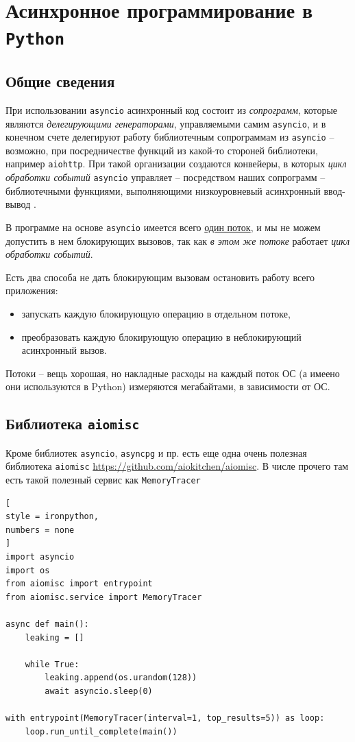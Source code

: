 \documentclass[%
	11pt,
	a4paper,
	utf8,
		]{article}
\begin{document}
\section{Асинхронное программирование в \texttt{Python}}

\subsection{Общие сведения}

При использовании \texttt{asyncio} асинхронный код состоит из \emph{сопрограмм}, которые являются \emph{делегирующими генераторами}, управляемыми самим \texttt{asyncio}, и в конечном счете делегируют работу библиотечным сопрограммам из \texttt{asyncio} -- возможно, при посредничестве функций из какой-то стороней библиотеки, например \texttt{aiohttp}. При такой организации создаются конвейеры, в которых \emph{цикл обработки событий} \texttt{asyncio} управляет -- посредством наших сопрограмм -- библиотечными функциями, выполняющими низкоуровневый асинхронный ввод-вывод \cite[]{ramalho:python-2016}.

В программе на основе \texttt{asyncio} имеется всего \underline{один поток}, и мы не можем допустить в нем блокирующих вызовов, так как \emph{в этом же потоке} работает \emph{цикл обработки событий}. 

Есть два способа не дать блокирующим вызовам остановить работу всего приложения:
\begin{itemize}
	\item запускать каждую блокирующую операцию в отдельном потоке,
	
	\item преобразовать каждую блокирующую операцию в неблокирующий асинхронный вызов.
\end{itemize}

Потоки -- вещь хорошая, но накладные расходы на каждый поток ОС (а имеено они используются в Python) измеряются мегабайтами, в зависимости от ОС.





\subsection{Библиотека \texttt{aiomisc}}

Кроме библиотек \texttt{asyncio}, \texttt{asyncpg} и пр. есть еще одна очень полезная библиотека \texttt{aiomisc} \url{https://github.com/aiokitchen/aiomisc}. В числе прочего там есть такой полезный сервис как \texttt{MemoryTracer}
\begin{lstlisting}[
style = ironpython,
numbers = none
]
import asyncio
import os
from aiomisc import entrypoint
from aiomisc.service import MemoryTracer

async def main():
    leaking = []
    
    while True:
        leaking.append(os.urandom(128))
        await asyncio.sleep(0)
        
with entrypoint(MemoryTracer(interval=1, top_results=5)) as loop:
    loop.run_until_complete(main())
\end{lstlisting}
\end{document}
